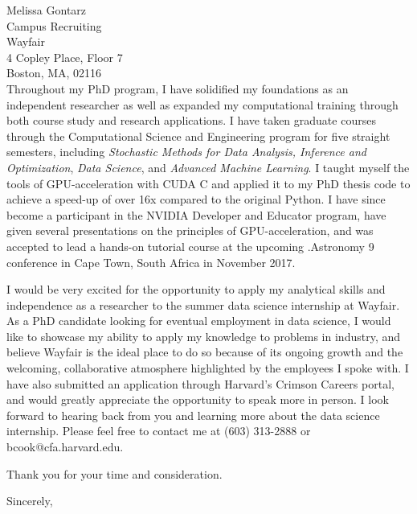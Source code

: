 \documentclass{letter}
\begin{document}
\begin{letter}{Melissa Gontarz\\
Campus Recruiting\\
Wayfair\\
4 Copley Place, Floor 7\\
Boston, MA, 02116\\
}
\noindent Throughout my PhD program, I have solidified my foundations
as an independent researcher as well as expanded my computational
training through both course study and research applications. I have
taken graduate courses through the Computational Science and
Engineering program for five straight semesters, including
\textit{Stochastic Methods for Data Analysis, Inference and
  Optimization}, \textit{Data Science}, and \textit{Advanced Machine
  Learning}. I taught myself the tools of GPU-acceleration with CUDA C
and applied it to my PhD thesis code to achieve a speed-up of over 16x
compared to the original Python. I have since become a participant in
the NVIDIA Developer and Educator program, have given several
presentations on the principles of GPU-acceleration, and was accepted
to lead a hands-on tutorial course at the upcoming .Astronomy 9
conference in Cape Town, South Africa in November 2017.

\noindent I would be very excited for the opportunity to apply my
analytical skills and independence as a researcher to the summer data
science internship at Wayfair. As a PhD candidate looking for eventual
employment in data science, I would like to showcase my ability to
apply my knowledge to problems in industry, and believe Wayfair is
the ideal place to do so because of its ongoing growth and the
welcoming, collaborative atmosphere highlighted by the employees I
spoke with. I have also submitted an application through Harvard's
Crimson Careers portal, and would greatly appreciate the opportunity
to speak more in person. I look forward to hearing back from you and
learning more about the data science internship. Please feel free to
contact me at (603) 313-2888 or bcook@cfa.harvard.edu.

Thank you for your time and consideration.


\closing{Sincerely,}


\end{letter}
\end{document}
